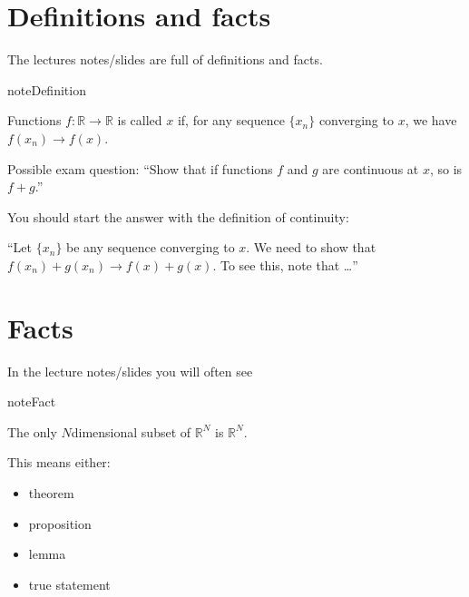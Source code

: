 \documentclass[letterpaper,10pt,english]{jupyterBook}
\begin{document}
\section{Definitions and facts}
\label{\detokenize{00.intro:definitions-and-facts}}
\sphinxAtStartPar
The lectures notes/slides are full of definitions and facts.

\begin{sphinxadmonition}{note}{Definition}

\sphinxAtStartPar
Functions \(f: \mathbb{R} \rightarrow \mathbb{R}\) is called  \(x\) if, for any sequence \(\{x_n\}\) converging to \(x\), we have \(f(x_n) \rightarrow f(x)\).
\end{sphinxadmonition}

\sphinxAtStartPar
Possible exam question: “Show  that if functions \(f\) and \(g\) are continuous at \(x\), so is \(f+g\).”

\sphinxAtStartPar
You should start the answer with the definition of continuity:

\sphinxAtStartPar
“Let \(\{x_n\}\) be any sequence converging to \(x\). We need to show that \(f(x_n) + g(x_n) \rightarrow f(x) + g(x)\). To see this, note that …”


\section{Facts}
\label{\detokenize{00.intro:facts}}
\sphinxAtStartPar
In the lecture notes/slides you will often see

\begin{sphinxadmonition}{note}{Fact}

\sphinxAtStartPar
The only \(N\)\sphinxhyphen{}dimensional subset of \(\mathbb{R}^N\) is \(\mathbb{R}^N\).
\end{sphinxadmonition}

\sphinxAtStartPar
This means either:
\begin{itemize}
\item {} 
\sphinxAtStartPar
theorem

\item {} 
\sphinxAtStartPar
proposition

\item {} 
\sphinxAtStartPar
lemma

\item {} 
\sphinxAtStartPar
true statement

\end{itemize}
\end{document}
